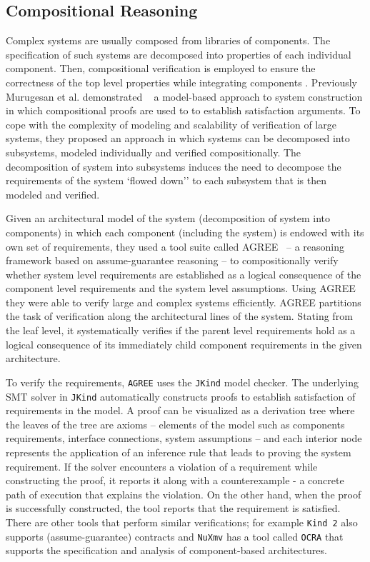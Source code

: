 \subsection{Compositional Reasoning}
Complex systems are usually composed from libraries of components. The specification of such systems are decomposed into properties of each individual component. Then, compositional verification is employed to ensure the correctness of the top level properties while integrating components \cite{NFM2012:CoGaMiWhLaLu}. Previously Murugesan et al. demonstrated ~\cite{hilt2013} a model-based approach to system construction in which compositional proofs are used to to establish satisfaction arguments. To cope with the complexity of modeling and scalability of verification of large systems,
they proposed an approach in which systems can be decomposed into subsystems, modeled individually and verified compositionally. The decomposition of system into subsystems induces the need to decompose the requirements of the system `flowed down'' to each subsystem that is then modeled and verified.

Given an architectural model of the system (decomposition of system into components) in which each component (including the system) is endowed with its own set of requirements,
 they used a tool suite called AGREE~\cite{NFM2012:CoGaMiWhLaLu} -- a reasoning framework based on assume-guarantee reasoning -- to compositionally verify whether system level requirements are established as a logical consequence of the component level requirements and the system level assumptions.
 Using AGREE they were able to verify large and complex systems efficiently. AGREE partitions the task of verification along the architectural lines of the system. Stating from the leaf level, it systematically verifies if the parent level requirements hold as a logical consequence of its immediately child component requirements in the given architecture.

To verify the requirements, \texttt{AGREE} uses the \texttt{JKind} \cite{jkind} model checker. The underlying SMT solver in  \texttt{JKind} automatically constructs proofs to establish satisfaction of requirements in the model. A proof can be visualized as a derivation tree where the leaves of the tree are axioms -- elements of the model such as components requirements, interface connections, system assumptions -- and each interior node represents the application of an inference rule that leads to proving the system requirement. If the solver encounters a violation of a requirement while constructing the proof, it reports it along with a counterexample - a concrete path of execution that explains the violation. On the other hand, when the proof is successfully constructed, the tool reports that the requirement is satisfied.
There are other tools that perform similar verifications; for example \texttt{Kind 2} \cite{champion2016cav} also supports (assume-guarantee) contracts and \texttt{NuXmv} has a tool called \texttt{OCRA} \cite{ocra} that supports the specification and analysis of component-based architectures.

